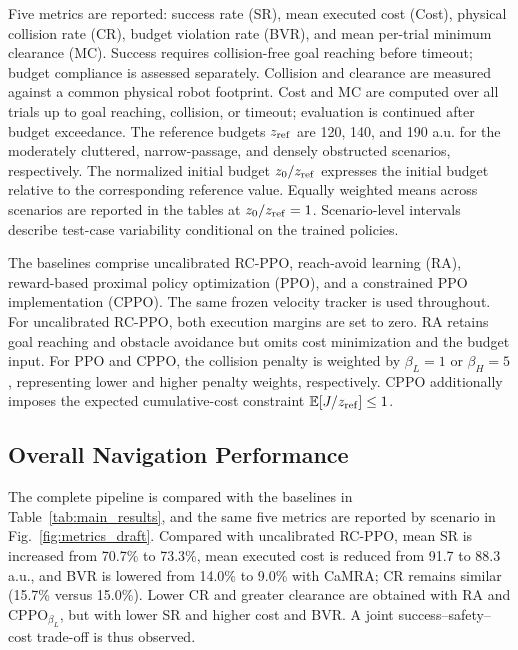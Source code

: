 \documentclass[conference]{IEEEtran}
\begin{document}
Five metrics are reported: success rate (SR), mean executed cost (Cost), physical
collision rate (CR), budget violation rate (BVR), and mean per-trial minimum
clearance (MC). Success requires collision-free goal reaching before timeout;
budget compliance is assessed separately. Collision and clearance are measured
against a common physical robot footprint. Cost and MC are computed over all trials up to goal reaching, collision, or
timeout; evaluation is continued after budget exceedance. The reference budgets
$z_{\rm ref}$ are 120, 140, and 190 a.u. for the moderately cluttered,
narrow-passage, and densely obstructed scenarios, respectively. The normalized
initial budget $z_0/z_{\rm ref}$ expresses the initial budget relative to the
corresponding reference value. Equally weighted means across scenarios are
reported in the tables at $z_0/z_{\rm ref}=1$. Scenario-level intervals describe
test-case variability conditional on the trained policies.

The baselines comprise uncalibrated RC-PPO, reach-avoid learning (RA), reward-based
proximal policy optimization (PPO), and a constrained PPO implementation (CPPO).
The same frozen velocity tracker is used throughout. For uncalibrated RC-PPO,
both execution margins are set to zero. RA retains goal reaching and obstacle
avoidance but omits cost minimization and the budget input. For PPO and CPPO,
the collision penalty is weighted by $\beta_L=1$ or $\beta_H=5$, representing
lower and higher penalty weights, respectively. CPPO additionally imposes the
expected cumulative-cost constraint $\mathbb{E}[J/z_{\rm ref}]\leq1$.

\subsection{Overall Navigation Performance}
\label{sec:overall_performance}
The complete pipeline is compared with the baselines in Table~\ref{tab:main_results},
and the same five metrics are reported by scenario in Fig.~\ref{fig:metrics_draft}.
Compared with uncalibrated RC-PPO, mean SR is increased from 70.7\% to
73.3\%, mean executed cost is reduced from 91.7 to 88.3 a.u., and BVR is lowered from
14.0\% to 9.0\% with CaMRA; CR remains similar (15.7\% versus 15.0\%). Lower CR
and greater clearance are obtained with RA and CPPO$_{\beta_L}$, but with lower
SR and higher cost and BVR. A joint success--safety--cost trade-off is thus observed.
\end{document}
